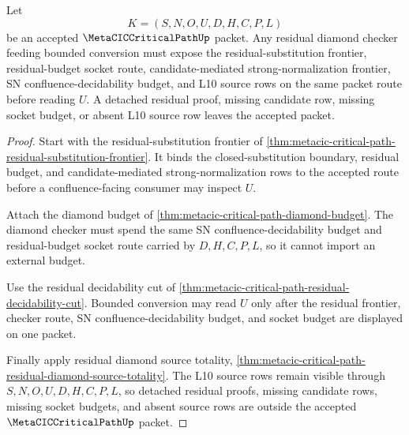 \begin{theorem}
\label{thm:metacic-critical-path-residual-diamond-budget-source-nonescape}
Let
$$
K=(S,N,O,U,D,H,C,P,L)
$$
be an accepted $\MetaCICCriticalPathUp$ packet. Any residual diamond checker feeding bounded conversion must expose the residual-substitution frontier, residual-budget socket route, candidate-mediated strong-normalization frontier, SN confluence-decidability budget, and L10 source rows on the same packet route before reading $U$. A detached residual proof, missing candidate row, missing socket budget, or absent L10 source row leaves the accepted packet.
\end{theorem}
\begin{proof}
Start with the residual-substitution frontier of \autoref{thm:metacic-critical-path-residual-substitution-frontier}. It binds the closed-substitution boundary, residual budget, and candidate-mediated strong-normalization rows to the accepted route before a confluence-facing consumer may inspect $U$.

Attach the diamond budget of \autoref{thm:metacic-critical-path-diamond-budget}. The diamond checker must spend the same SN confluence-decidability budget and residual-budget socket route carried by $D,H,C,P,L$, so it cannot import an external budget.

Use the residual decidability cut of \autoref{thm:metacic-critical-path-residual-decidability-cut}. Bounded conversion may read $U$ only after the residual frontier, checker route, SN confluence-decidability budget, and socket budget are displayed on one packet.

Finally apply residual diamond source totality, \autoref{thm:metacic-critical-path-residual-diamond-source-totality}. The L10 source rows remain visible through $S,N,O,U,D,H,C,P,L$, so detached residual proofs, missing candidate rows, missing socket budgets, and absent source rows are outside the accepted $\MetaCICCriticalPathUp$ packet.
\end{proof}

